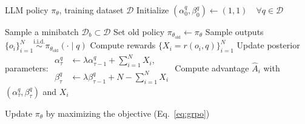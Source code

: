 
\begin{algorithm}[t]
\caption{Discounted Beta--Bernoulli Reward Estimation}
\label{alg:grpohistbeta}
\begin{algorithmic}[1]
\INPUT LLM policy $\pi_\theta$, training dataset $\mathcal{D}$
\STATE Initialize $(\alpha^q_0,\beta^q_0) \leftarrow (1,1) \quad \forall q\in\mathcal{D}$

    \STATE Sample a minibatch $\mathcal{D}_b \subset \mathcal{D}$
    \STATE Set old policy $\pi_{\theta_{\mathrm{old}}} \leftarrow \pi_{\theta}$
      \STATE Sample outputs $\{o_i\}_{i=1}^N \overset{\text{i.i.d.}}{\sim} \pi_{\theta_{\mathrm{old}}}(\cdot \mid q)$
      \STATE Compute rewards $\{X_i=r(o_i, q)\}_{i=1}^N$
      \STATE Update posterior parameters:
      \STATE \hspace{1em}\(
      \begin{aligned}
        \alpha^q_{\tau} &\leftarrow \lambda \alpha^q_{\tau-1} + \sum_{i=1}^N X_i, \\
        \beta^q_{\tau}  &\leftarrow \lambda \beta^q_{\tau-1}  + N - \sum_{i=1}^N X_i
      \end{aligned}
      \)
      \STATE Compute advantage $\hat{A}_i$ with $(\alpha^q_{\tau},\beta^q_{\tau})$ and $X_i$
    \ENDFOR

      \STATE Update $\pi_{\theta}$ by maximizing the objective (Eq.~\ref{eq:grpo})
    \ENDFOR
  \ENDFOR
\ENDFOR
\end{algorithmic}
\end{algorithm}
